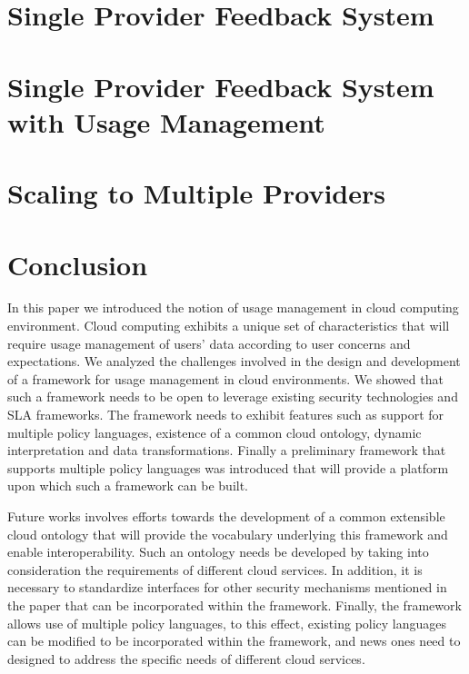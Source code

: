 \documentclass[times, 10pt,twocolumn]{article}
\begin{document}


\section{Single Provider Feedback System}\label{sec:single}

\section{Single Provider Feedback System with Usage Management}\label{sec:singleUm}

\section{Scaling to Multiple Providers}\label{sec:multiple}

\section{Conclusion}
In this paper we introduced the notion of usage management in cloud computing environment. Cloud computing exhibits a unique set of characteristics that will require usage management of users' data according to user concerns and expectations. We analyzed the challenges involved in the design and development of a framework for usage management in cloud environments. We showed that such a framework needs to be open to leverage existing security technologies and SLA frameworks. The framework needs to exhibit features such as support for multiple policy languages, existence of a common cloud ontology, dynamic interpretation and data transformations. Finally a preliminary framework that supports multiple policy languages was introduced that will provide a platform upon which such a framework can be built. 

Future works involves efforts towards the development of a common extensible cloud ontology that will provide the vocabulary underlying this framework and enable interoperability. Such an ontology needs be developed by taking into consideration the requirements of different cloud services. In addition, it is necessary to standardize interfaces for other security mechanisms mentioned in the paper that can be incorporated within the framework. Finally, the framework allows use of multiple policy languages, to this effect, existing policy languages can be modified to be incorporated within the framework, and news ones need to designed to address the specific needs of different cloud services.



\end{document}
